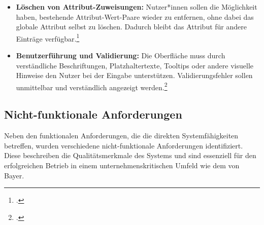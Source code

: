 \begin{itemize}
  \item \textbf{Löschen von Attribut-Zuweisungen:} 
Nutzer*innen sollen die Möglichkeit haben, bestehende Attribut-Wert-Paare wieder zu entfernen, ohne dabei das globale Attribut selbst zu löschen. 
Dadurch bleibt das Attribut für andere Einträge verfügbar.\footcite[Vgl.][]{ErdemFinin2009}

  \item \textbf{Benutzerführung und Validierung:} 
Die Oberfläche muss durch verständliche Beschriftungen, Platzhaltertexte, Tooltips oder andere visuelle Hinweise den Nutzer bei der Eingabe unterstützen. 
Validierungsfehler sollen unmittelbar und verständlich angezeigt werden.\footcite[Vgl.][]{Nielsen2014}
\end{itemize}

\subsection{Nicht-funktionale Anforderungen}
Neben den funktionalen Anforderungen, die die direkten Systemfähigkeiten betreffen, wurden verschiedene nicht-funktionale Anforderungen identifiziert. Diese beschreiben die Qualitätsmerkmale des Systems und sind essenziell 
für den erfolgreichen Betrieb in einem unternehmenskritischen Umfeld wie dem von Bayer.

